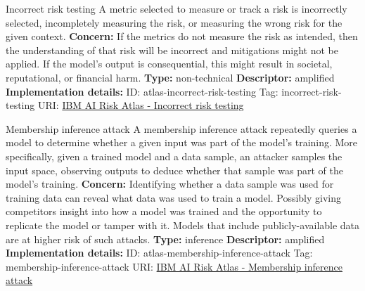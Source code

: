 \documentclass[a4paper,12pt]{article}
\begin{document}
\begin{definitionbox}{Incorrect risk testing}
A metric selected to measure or track a risk is incorrectly selected, incompletely measuring the risk, or measuring the wrong risk for the given context.\newline\newline
\textbf{Concern: }If the metrics do not measure the risk as intended, then the understanding of that risk will be incorrect and mitigations might not be applied. If the model's output is consequential, this might result in societal, reputational, or financial harm.\newline\newline
\textbf{Type: }non-technical\newline
\textbf{Descriptor: }amplified \newline\newline
\textbf{Implementation details: } \newline
ID: atlas-incorrect-risk-testing \newline
Tag: incorrect-risk-testing \newline
URI:  \href{https://www.ibm.com/docs/en/watsonx/saas?topic=SSYOK8/wsj/ai-risk-atlas/incorrect-risk-testing.html}{IBM AI Risk Atlas - Incorrect risk testing}\newline
\end{definitionbox}
\begin{definitionbox}{Membership inference attack}
A membership inference attack repeatedly queries a model to determine whether a given input was part of the model's training. More specifically, given a trained model and a data sample, an attacker samples the input space, observing outputs to deduce whether that sample was part of the model's training. \newline\newline
\textbf{Concern: }Identifying whether a data sample was used for training data can reveal what data was used to train a model. Possibly giving competitors insight into how a model was trained and the opportunity to replicate the model or tamper with it. Models that include publicly-available data are at higher risk of such attacks.\newline\newline
\textbf{Type: }inference\newline
\textbf{Descriptor: }amplified \newline\newline
\textbf{Implementation details: } \newline
ID: atlas-membership-inference-attack \newline
Tag: membership-inference-attack \newline
URI:  \href{https://www.ibm.com/docs/en/watsonx/saas?topic=SSYOK8/wsj/ai-risk-atlas/membership-inference-attack.html}{IBM AI Risk Atlas - Membership inference attack}\newline
\end{definitionbox}
\end{document}
